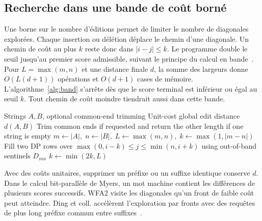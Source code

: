 \subsection{Recherche dans une bande de coût borné}
Une borne sur le nombre d'éditions permet de limiter le nombre de diagonales explorées. Chaque insertion ou délétion déplace le chemin d'une diagonale. Un chemin de coût au plus \(k\) reste donc dans \(\lvert i-j\rvert\le k\). Le programme double le seuil jusqu'au premier score admissible, suivant le principe du calcul en bande~\cite{ukkonen}. Pour \(L=\max(m,n)\) et une distance finale \(d\), la somme des largeurs donne \(O(L(d+1))\) opérations et \(O(d+1)\) cases de mémoire.
L’algorithme~\ref{alg:band} s’arrête dès que le score terminal est inférieur ou égal au seuil \(k\). Tout chemin de coût moindre tiendrait aussi dans cette bande.
\begin{algorithm}[!htbp]
\caption{Alignement global par élargissement de bande}\label{alg:band}
\begin{algorithmic}[1]
\Require Strings \(A,B\), optional common-end trimming
\Ensure Unit-cost global edit distance \(d(A,B)\)
\State Trim common ends if requested and return the other length if one string is empty
\State \(m\gets |A|,\; n\gets |B|,\; L\gets\max(m,n),\; k\gets\max(1,|m-n|)\)
\Loop
  \State Fill two DP rows over \(\max(0,i-k)\le j\le\min(n,i+k)\) using out-of-band sentinels
   \State \Return \(D_{mn}\) \EndIf
  \State \(k\gets\min(2k,L)\)
\EndLoop
\end{algorithmic}
\end{algorithm}
Avec des coûts unitaires, supprimer un préfixe ou un suffixe identique conserve \(d\). Dans le calcul bit-parallèle de Myers, un mot machine contient les différences de plusieurs scores successifs. WFA2 visite les diagonales qu’un front de faible coût peut atteindre. Ding et coll. accélèrent l’exploration par fronts avec des requêtes de plus long préfixe commun entre suffixes~\cite{ding}.


